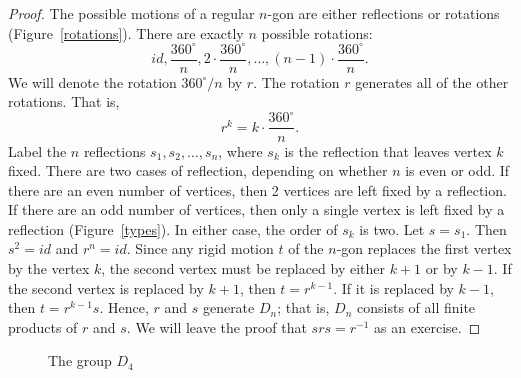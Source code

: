  
\begin{proof}
The possible motions of a regular $n$-gon are either reflections or 
rotations (Figure~\ref{rotations}). There are exactly $n$ possible
rotations:
\[
id, \frac{360^{\circ} }{n}, 2 \cdot \frac{360^{\circ} }{n},
\ldots, (n-1) \cdot \frac{360^{\circ} }{n}.
\]
We will denote the rotation $360^{\circ} /n$ by $r$. The rotation $r$
generates all  of the other rotations. That is,
\[
r^k = k \cdot \frac{360^{\circ} }{n}.
\]
Label the $n$ reflections $s_1, s_2, \ldots, s_n$, where $s_k$ is the 
reflection that leaves vertex $k$ fixed. There are two cases of 
reflection, depending on whether $n$ is even or odd. If there are an 
even number of vertices, then 2 vertices are left fixed by a 
reflection. If there are an odd number of vertices, then only a single 
vertex is left fixed by a reflection (Figure~\ref{types}). 
In either case, the order of $s_k$ is two. Let $s = s_1$. Then $s^2 = id$ and 
$r^n = id$. Since any rigid motion $t$ of the $n$-gon replaces the 
first vertex by the vertex $k$, the second vertex must be replaced 
by either $k+1$ or by $k-1$. If the second vertex is replaced by $k+1$, then $t = r^{k - 1}$.
If it is replaced by $k-1$, then $t = r^{k - 1} s$. Hence, $r$ and $s$
generate $D_n$; that is, $D_n$ consists of all finite products of $r$
and $s$. We will leave the proof that $srs = r^{-1}$ as an exercise.
\end{proof}
 
 
\begin{figure}[hbt]
\begin{center}

\end{center}
\caption{The group $D_4$}
\label{D4}
\end{figure}
 

